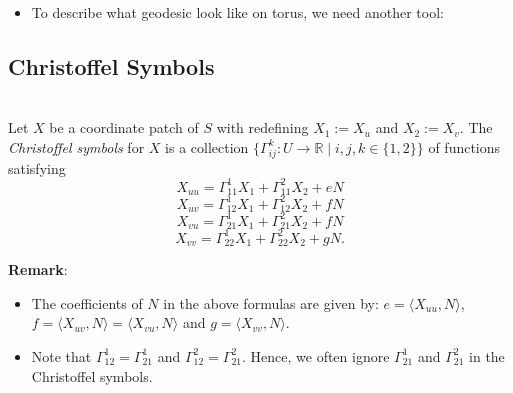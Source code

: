\begin{itemize}
\noindent\textit{Proof}: Let $X(u, v) = (\cos u, \sin u, v)$ be a parametrization of cylinder. Then $X_u = (-\sin u, \cos u, 0)$ and $X_v = (0, 0, 1)$. Hence,
\[
N = \frac{X_u\times X_v}{\|X_u\times X_v\|} = (\cos u, \sin u, 0)
\]
so $N(\alpha(t)) = (\cos(at), \sin(at), 0)$. Since $\alpha'(t) = (-a\sin(at), a\cos(at), q'(t))$ and $\alpha''(t) = (-a^2\cos(at), -a^2\sin(at), q''(t))$, then
\[
\det\big(N(\alpha(t)),\ \alpha'(t),\ \alpha''(t)\big) = \begin{vmatrix}
\cos(at) & -a\sin(at) & -a^2\cos(at)\\
\sin(at) & a\cos(at) & -a^2\sin(at)\\
0 & q'(t) & q''(t)
\end{vmatrix}
\]
\[
= -q'(t)\begin{vmatrix}\cos(at) & -a^2\cos(at)\\ \sin(at) & -a^2\sin(at)\end{vmatrix} + q''(t)\begin{vmatrix}\cos(at) & -a\sin(at)\\ \sin(at) & a\cos(at)\end{vmatrix}
\]
\[
= aq''(t)
\]
Therefore, $\alpha$ is a geodesic $\iff \det\big(N\alpha,\ \alpha',\ \alpha''\big) = 0 \iff q''(t) = 0$. $\square$
\item To describe what geodesic look like on torus, we need another tool:
\end{itemize}

\subsection{Christoffel Symbols}

\\
Let $X$ be a coordinate patch of $S$ with redefining $X_1 := X_u$ and $X_2 := X_v$. The \textit{Christoffel symbols} for $X$ is a collection $\big\{\Gamma_{ij}^k: U\to\mathbb{R} \mid i, j, k\in\{1, 2\}\big\}$ of functions satisfying
\[
X_{uu} = \Gamma_{11}^1X_1 + \Gamma_{11}^2X_2 + eN
\]
\[
X_{uv} = \Gamma_{12}^1X_1 + \Gamma_{12}^2X_2 + fN
\]
\[
X_{vu} = \Gamma_{21}^1X_1 + \Gamma_{21}^2X_2 + fN
\]
\[
X_{vv} = \Gamma_{22}^1X_1 + \Gamma_{22}^2X_2 + gN.
\]

\noindent\textbf{Remark}:
\begin{itemize}
\item The coefficients of $N$ in the above formulas are given by: $e = \langle X_{uu}, N\rangle$, $f = \langle X_{uv}, N\rangle = \langle X_{vu}, N\rangle$ and $g = \langle X_{vv}, N\rangle$.
\item Note that $\Gamma_{12}^1 = \Gamma_{21}^1$ and $\Gamma_{12}^2 = \Gamma_{21}^2$. Hence, we often ignore $\Gamma_{21}^1$ and $\Gamma_{21}^2$ in the Christoffel symbols.
\end{itemize}


